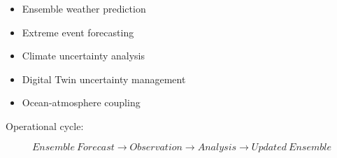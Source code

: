 \begin{itemize}

\item Ensemble weather prediction

\item Extreme event forecasting

\item Climate uncertainty analysis

\item Digital Twin uncertainty management

\item Ocean-atmosphere coupling

\end{itemize}



Operational cycle:


\[
Ensemble\ Forecast
\rightarrow
Observation
\rightarrow
Analysis
\rightarrow
Updated\ Ensemble
\]
